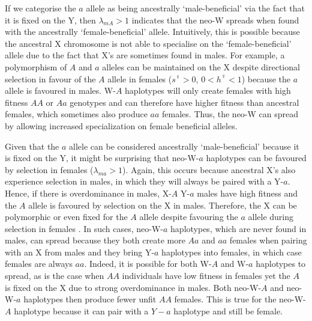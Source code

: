 \documentclass[12pt]{article}
\begin{document}
If we categorise the $a$ allele as being ancestrally `male-beneficial' via the fact that it is fixed on the Y, then $\lambda_{mA}>1$ indicates that the neo-W spreads when found with the ancestrally `female-beneficial' allele. 
Intuitively, this is possible because the ancestral X chromosome is not able to specialise on the `female-beneficial' allele due to the fact that X's are sometimes found in males. 
For example, a polymorphism of $A$ and $a$ alleles can be maintained on the X despite directional selection in favour of the $A$ allele in females ($s^\female>0$, $0<h^\female<1$) because the $a$ allele is favoured in males. 
W-$A$ haplotypes will only create females with high fitness $AA$ or $Aa$ genotypes and can therefore have higher fitness than ancestral females, which sometimes also produce $aa$ females. 
Thus, the neo-W can spread by allowing increased specialization on female beneficial alleles.

Given that the $a$ allele can be considered ancestrally `male-beneficial' because it is fixed on the Y, it might be surprising that neo-W-$a$ haplotypes can be favoured by selection in females ($\lambda_{ma}>1$). 
Again, this occurs because ancestral X's also experience selection in males, in which they will always be paired with a Y-$a$. 
Hence, if there is overdominance in males, X-$A$ Y-$a$ males have high fitness and the $A$ allele is favoured by selection on the X in males. 
Therefore, the X can be polymorphic or even fixed for the $A$ allele despite favouring the $a$ allele during selection in females \citep{Lloyd1977,Otto2014}. 
In such cases, neo-W-$a$ haplotypes, which are never found in males, can spread because they both create more $Aa$ and $aa$ females when pairing with an X from males and they bring Y-$a$ haplotypes into females, in which case females are always $aa$. 
Indeed, it is possible for both W-$A$ and W-$a$ haplotypes to spread, as is the case when $AA$ individuals have low fitness in females yet the $A$ is fixed on the X due to strong overdominance in males.
Both neo-W-$A$ and neo-W-$a$ haplotypes then produce fewer unfit $AA$ females.
This is true for the neo-W-$A$ haplotype because it can pair with a $Y-a$ haplotype and still be female. 
\end{document}
